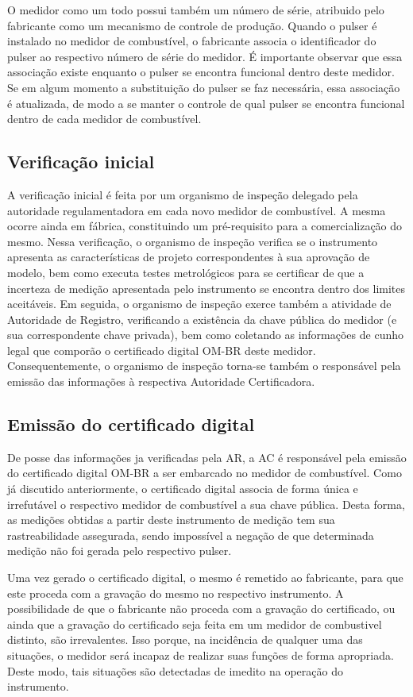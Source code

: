 \documentclass[12pt]{article}
\begin{document}
O medidor como um todo possui também um número de série, atribuido pelo fabricante como um mecanismo de controle de produção.
Quando o pulser é instalado no medidor de combustível, o fabricante associa o identificador do pulser ao respectivo número de série do medidor.
É importante observar que essa associação existe enquanto o pulser se encontra funcional dentro deste medidor.
Se em algum momento a substituição do pulser se faz necessária, essa associação é atualizada, de modo a se manter o controle de qual pulser se encontra funcional dentro de cada medidor de combustível.

\subsection{Verificação inicial}
A verificação inicial é feita por um organismo de inspeção delegado pela autoridade regulamentadora em cada novo medidor de combustível.
A mesma ocorre ainda em fábrica, constituindo um pré-requisito para a comercialização do mesmo.
Nessa verificação, o organismo de inspeção verifica se o instrumento apresenta as características de projeto correspondentes à sua aprovação de modelo, bem como executa testes metrológicos para se certificar de que a incerteza de medição apresentada pelo instrumento se encontra dentro dos limites aceitáveis.
Em seguida, o organismo de inspeção exerce também a atividade de Autoridade de Registro, verificando a existência da chave pública do medidor (e sua correspondente chave privada), bem como coletando as informações de cunho legal que comporão o certificado digital OM-BR deste medidor.
Consequentemente, o organismo de inspeção torna-se também o responsável pela emissão das informações à respectiva Autoridade Certificadora.

\subsection{Emissão do certificado digital}
De posse das informações ja verificadas pela AR, a AC é responsável pela emissão do certificado digital OM-BR a ser embarcado no medidor de combustível.
Como já discutido anteriormente, o certificado digital associa de forma única e irrefutável o respectivo medidor de combustível a sua chave pública.
Desta forma, as medições obtidas a partir deste instrumento de medição tem sua rastreabilidade assegurada, sendo impossível a negação de que determinada medição não foi gerada pelo respectivo pulser.

Uma vez gerado o certificado digital, o mesmo é remetido ao fabricante, para que este proceda com a gravação do mesmo no respectivo instrumento.
A possibilidade de que o fabricante não proceda com a gravação do certificado, ou ainda que a gravação do certificado seja feita em um medidor de combustivel distinto, são irrevalentes.
Isso porque, na incidência de qualquer uma das situações, o medidor será incapaz de realizar suas funções de forma apropriada.
Deste modo, tais situações são detectadas de imedito na operação do instrumento.
\end{document}
